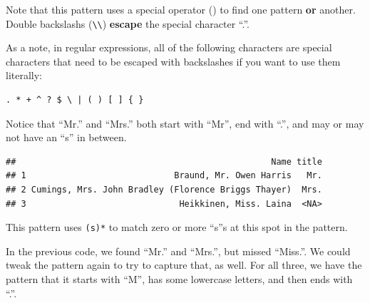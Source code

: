 \documentclass[]{book}
\makeatletter
\newenvironment{Shaded}{\begin{snugshade}}{\end{snugshade}}
\newcommand{\KeywordTok}[1]{\textcolor[rgb]{0.13,0.29,0.53}{\textbf{{#1}}}}
\newcommand{\DataTypeTok}[1]{\textcolor[rgb]{0.13,0.29,0.53}{{#1}}}
\newcommand{\DecValTok}[1]{\textcolor[rgb]{0.00,0.00,0.81}{{#1}}}
\newcommand{\CharTok}[1]{\textcolor[rgb]{0.31,0.60,0.02}{{#1}}}
\newcommand{\StringTok}[1]{\textcolor[rgb]{0.31,0.60,0.02}{{#1}}}
\newcommand{\NormalTok}[1]{{#1}}
\newenvironment{kframe}{%
\medskip{}
\setlength{\fboxsep}{.8em}
 \def\at@end@of@kframe{}%
 \ifinner\ifhmode%
  \def\at@end@of@kframe{\end{minipage}}%
  \begin{minipage}{\columnwidth}%
 \fi\fi%
 \def\FrameCommand##1{\hskip\@totalleftmargin \hskip-\fboxsep
 \colorbox{shadecolor}{##1}\hskip-\fboxsep
     \hskip-\linewidth \hskip-\@totalleftmargin \hskip\columnwidth}%
 \MakeFramed {\advance\hsize-\width
   \@totalleftmargin\z@ \linewidth\hsize
   \@setminipage}}%
 {\par\unskip\endMakeFramed%
 \at@end@of@kframe}
\renewenvironment{Shaded}{\begin{kframe}}{\end{kframe}}
\makeatother
\begin{document}
Note that this pattern uses a special operator (\texttt{\textbar{}}) to
find one pattern \textbf{or} another. Double backslashs
(\texttt{\textbackslash{}\textbackslash{}}) \textbf{escape} the special
character ``.''.

As a note, in regular expressions, all of the following characters are
special characters that need to be escaped with backslashes if you want
to use them literally:

\begin{verbatim}
. * + ^ ? $ \ | ( ) [ ] { }
\end{verbatim}

Notice that ``Mr.'' and ``Mrs.'' both start with ``Mr'', end with ``.'',
and may or may not have an ``s'' in between.

\begin{Shaded}
\end{Shaded}

\begin{verbatim}
##                                                  Name title
## 1                             Braund, Mr. Owen Harris   Mr.
## 2 Cumings, Mrs. John Bradley (Florence Briggs Thayer)  Mrs.
## 3                              Heikkinen, Miss. Laina  <NA>
\end{verbatim}

This pattern uses \texttt{(s)*} to match zero or more ``s''s at this
spot in the pattern.

In the previous code, we found ``Mr.'' and ``Mrs.'', but missed
``Miss.''. We could tweak the pattern again to try to capture that, as
well. For all three, we have the pattern that it starts with ``M'', has
some lowercase letters, and then ends with ``.''.

\begin{Shaded}
\end{Shaded}
\end{document}
